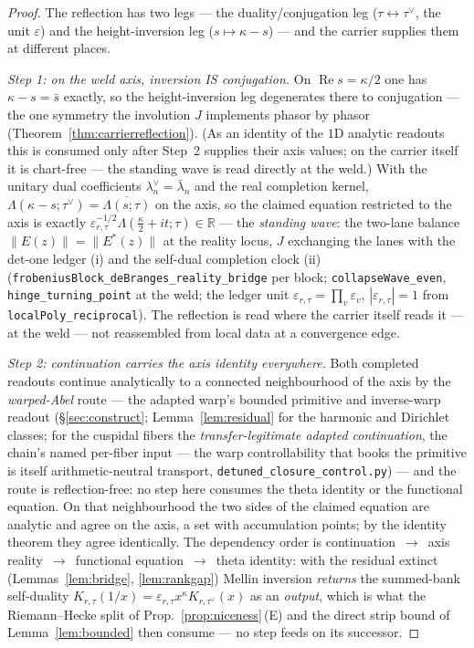 \documentclass[11pt]{article}
\theoremstyle{definition}
\renewcommand{\Re}{\operatorname{Re}}
\begin{document}
\begin{proof}
The reflection has two legs --- the duality/conjugation leg ($\tau\leftrightarrow\tau^\vee$, the unit
$\varepsilon$) and the height-inversion leg ($s\mapsto\kappa-s$) --- and the carrier supplies them at
different places.

\emph{Step 1: on the weld axis, inversion IS conjugation.} On $\Re s=\kappa/2$ one has $\kappa-s=\bar s$
exactly, so the height-inversion leg degenerates there to conjugation --- the one symmetry the involution $J$
implements phasor by phasor (Theorem~\ref{thm:carrierreflection}). (As an identity of the $1$D analytic
readouts this is consumed only after Step~2 supplies their axis values; on the carrier itself it is chart-free
--- the standing wave is read directly at the weld.) With the unitary dual coefficients
$\lambda_n^{\vee}=\bar\lambda_n$ and the real completion kernel,
$\Lambda(\kappa-s;\tau^\vee)=\overline{\Lambda(s;\tau)}$ on the axis, so the claimed equation restricted to
the axis is exactly $\varepsilon_{r,\tau}^{-1/2}\Lambda(\tfrac\kappa2+it;\tau)\in\mathbb R$ --- the
\emph{standing wave}: the two-lane balance $\|E(z)\|=\|E^{*}(z)\|$ at the reality locus, $J$ exchanging the
lanes with the det-one ledger \textup{(i)} and the self-dual completion clock \textup{(ii)}
(\texttt{frobeniusBlock\_deBranges\_reality\_bridge} per block; \texttt{collapseWave\_even},
\texttt{hinge\_turning\_point} at the weld; the ledger unit $\varepsilon_{r,\tau}=\prod_v\varepsilon_v$,
$|\varepsilon_{r,\tau}|=1$ from \texttt{localPoly\_reciprocal}). The reflection is read where the carrier
itself reads it --- at the weld --- not reassembled from local data at a convergence edge.

\emph{Step 2: continuation carries the axis identity everywhere.} Both completed readouts continue
analytically to a connected neighbourhood of the axis by the \emph{warped-Abel} route --- the adapted warp's
bounded primitive and inverse-warp readout (\S\ref{sec:construct}; Lemma~\ref{lem:residual} for the harmonic
and Dirichlet classes; for the cuspidal fibers the \emph{transfer-legitimate adapted continuation}, the chain's
named per-fiber input --- the warp controllability that books the primitive is itself arithmetic-neutral
transport, \texttt{detuned\_closure\_control.py}) --- and the route is
reflection-free: no step here consumes the theta identity or the functional equation. On that neighbourhood
the two sides of the claimed equation are analytic and agree on the axis, a set with accumulation points; by
the identity theorem they agree identically. The dependency order is
continuation~$\to$~axis reality~$\to$~functional equation~$\to$~theta identity: with the residual extinct
(Lemmas~\ref{lem:bridge}, \ref{lem:rankgap}) Mellin inversion \emph{returns} the summed-bank self-duality
$K_{r,\tau}(1/x)=\varepsilon_{r,\tau}x^{\kappa}K_{r,\tau^\vee}(x)$ as an \emph{output}, which is what the
Riemann--Hecke split of Prop.~\ref{prop:niceness}\,(E) and the direct strip bound of Lemma~\ref{lem:bounded}
then consume --- no step feeds on its successor.


\end{proof}
\end{document}

